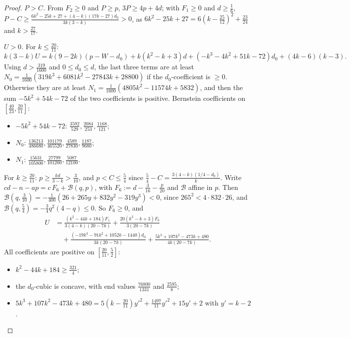 \documentclass[11pt,a4paper]{article}
\numberwithin{equation}{section}
\theoremstyle{definition}
\begin{document}
\begin{proof}
\emph{$P>C$.} From $F_2\ge0$ and $P\ge p$, $3P\ge4p+4d$; with $F_1\ge0$ and
$d\ge\frac16$,
$P-C\ge\frac{6k^2-25k+27+(4-k)(17k-27)d_0}{3k(3-k)}>0$, as
$6k^2-25k+27=6(k-\frac{25}{12})^2+\frac{23}{24}$ and $k>\frac{27}{17}$.

\emph{$U>0$.} For $k\le\frac{20}{11}$:
\[
k(3-k)U=k(9-2k)(p-W-d_0)+k(k^2-k+3)d+(-k^3-4k^2+51k-72)d_0+(4k-6)(k-3).
\]
Using $d>\frac{319}{1600}$ and $0\le d_0\le d$, the last three terms are at
least $N_0=\frac1{1600}(319k^3+6081k^2-27843k+28800)$ if the $d_0$-coefficient
is $\ge0$. Otherwise they are at least
$N_1=\frac1{1600}(4805k^2-11574k+5832)$, and then the sum $-5k^2+54k-72$ of the
two coefficients is positive. Bernstein coefficients on
$[\frac{40}{23},\frac{20}{11}]$:
\begin{itemize}
\item $-5k^2+54k-72$: $\frac{3592}{529},\frac{2084}{253},\frac{1168}{121}$;
\item $N_0$: $\frac{136213}{486680},\frac{101179}{465520},\frac{4589}{27830},\frac{1187}{9680}$;
\item $N_1$: $\frac{15631}{105800},\frac{27799}{101200},\frac{5087}{12100}$.
\end{itemize}
For $k\ge\frac{20}{11}$: $p\ge\frac{kd}{3-k}>\frac3{10}$, and $p<C\le\frac54$
since $\frac54-C=\frac{3(4-k)(1/4-d_0)}k$. Write
$cd-n-ap=c\,F_6+\mathcal B(q,p)$, with $F_6:=d-\frac3{16}-\frac p{20}$ and
$\mathcal B$ affine in $p$. Then
$\mathcal B(q,\frac3{10})=-\frac1{400}(26+265y+832y^2-319y^3)<0$, since
$265^2<4\cdot832\cdot26$, and $\mathcal B(q,\frac54)=-\frac34q^2(4-q)\le0$. So
$F_6\ge0$, and
\begin{align*}
U&=\frac{(k^2-44k+184)F_1}{3(4-k)(20-7k)}+\frac{20(k^2-k+3)F_6}{3(20-7k)}\\
&\quad+\frac{(-19k^3-91k^2+1052k-1440)d_0}{3k(20-7k)}+\frac{5k^3+107k^2-473k+480}{4k(20-7k)} .
\end{align*}
All coefficients are positive on $[\frac{20}{11},\frac52]$:
\begin{itemize}
\item $k^2-44k+184\ge\frac{321}4$;
\item the $d_0$-cubic is concave, with end values $\frac{76800}{1331}$ and
$\frac{2595}8$;
\item $5k^3+107k^2-473k+480=5(k-\frac{20}{11})y'^2+\frac{1497}{11}y'^2+15y'+2$
with $y'=k-2$.
\end{itemize}


\end{proof}
\end{document}
